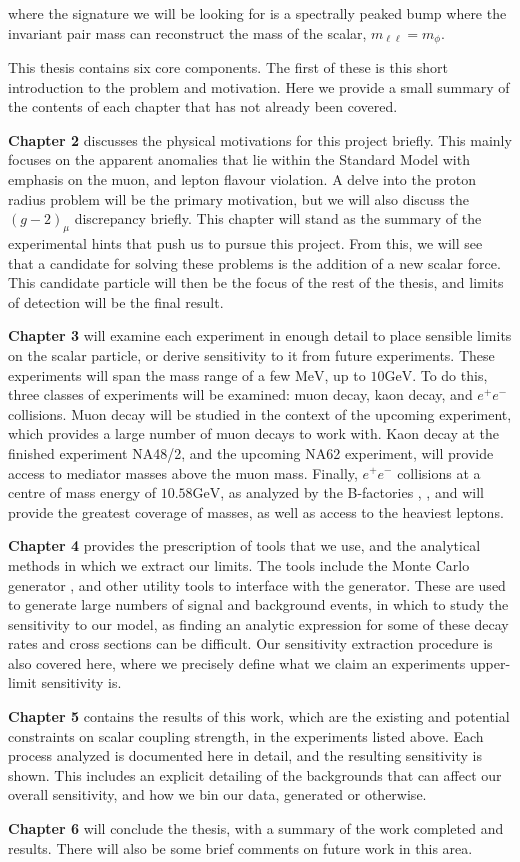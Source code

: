\noindent where the signature we will be looking for is a spectrally peaked bump where the invariant pair mass can reconstruct the mass of the scalar, $m_{\ell\ell} = m_\phi$.

This thesis contains six core components.
The first of these is this short introduction to the problem and motivation.
Here we provide a small summary of the contents of each chapter that has not already been covered.

\textbf{Chapter 2} discusses the physical motivations for this project briefly.
This mainly focuses on the apparent anomalies that lie within the Standard Model with emphasis on the muon, and lepton flavour violation.
A delve into the proton radius problem will be the primary motivation, but we will also discuss the $(g-2)_\mu$ discrepancy briefly.
This chapter will stand as the summary of the experimental hints that push us to pursue this project.
From this, we will see that a candidate for solving these problems is the addition of a new scalar force.
This candidate particle will then be the focus of the rest of the thesis, and limits of detection will be the final result.

\textbf{Chapter 3} will examine each experiment in enough detail to place sensible limits on the scalar particle, or derive sensitivity to it from future experiments.
These experiments will span the mass range of a few $\textrm{MeV}$, up to $10\textrm{GeV}$.
To do this, three classes of experiments will be examined: muon decay, kaon decay, and $e^+ e^-$ collisions.
Muon decay will be studied in the context of the upcoming \mueee experiment, which provides a large number of muon decays to work with.
Kaon decay at the finished experiment NA48/2, and the upcoming NA62 experiment, will provide access to mediator masses above the muon mass.
Finally, $e^+ e^-$ collisions at a centre of mass energy of $10.58\textrm{GeV}$, as analyzed by the B-factories \babar, \belle, and \belletwo will provide the greatest coverage of masses, as well as access to the heaviest leptons.

\textbf{Chapter 4} provides the prescription of tools that we use, and the analytical methods in which we extract our limits.
The tools include the Monte Carlo generator \madgraph, and other utility tools to interface with the generator.
These are used to generate large numbers of signal and background events, in which to study the sensitivity to our model, as finding an analytic expression for some of these decay rates and cross sections can be difficult.
Our sensitivity extraction procedure is also covered here, where we precisely define what we claim an experiments upper-limit sensitivity is.

\textbf{Chapter 5} contains the results of this work, which are the existing and potential constraints on scalar coupling strength, in the experiments listed above.
Each process analyzed is documented here in detail, and the resulting sensitivity is shown.
This includes an explicit detailing of the backgrounds that can affect our overall sensitivity, and how we bin our data, generated or otherwise.

\textbf{Chapter 6} will conclude the thesis, with a summary of the work completed and results.
There will also be some brief comments on future work in this area.
